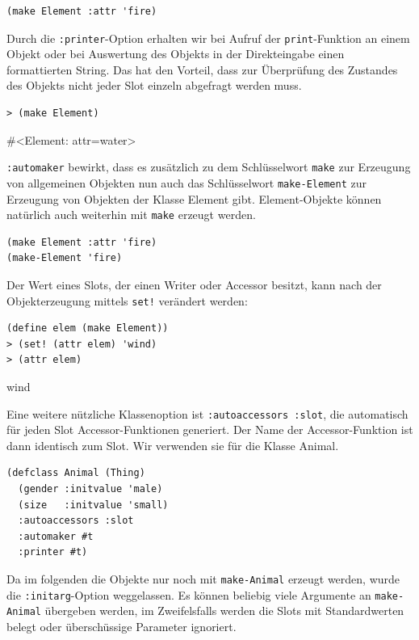 \begin{lstlisting}
(make Element :attr 'fire)
\end{lstlisting}

Durch die \texttt{:printer}-Option erhalten wir bei Aufruf der \texttt{print}-Funktion an einem Objekt oder bei Auswertung des Objekts in der Direkteingabe einen formattierten String. Das hat den Vorteil, dass zur Überprüfung des Zustandes des Objekts nicht jeder Slot einzeln abgefragt werden muss.

\begin{lstlisting}
> (make Element)
\end{lstlisting}
{\routput \#<Element: attr=water>}

\texttt{:automaker} bewirkt, dass es zusätzlich zu dem Schlüsselwort \texttt{make} zur Erzeugung von allgemeinen Objekten nun auch das Schlüsselwort \texttt{make-Element} zur Erzeugung von Objekten der Klasse Element gibt. Element-Objekte können natürlich auch weiterhin mit \texttt{make} erzeugt werden.

\begin{lstlisting}
(make Element :attr 'fire)
(make-Element 'fire)
\end{lstlisting}

Der Wert eines Slots, der einen Writer oder Accessor besitzt, kann nach der Objekterzeugung mittels \texttt{set!} verändert werden:

\begin{lstlisting}
(define elem (make Element))
> (set! (attr elem) 'wind)
> (attr elem)
\end{lstlisting}
{\routput wind}

Eine weitere nützliche Klassenoption ist \texttt{:autoaccessors :slot}, die automatisch für jeden Slot Accessor-Funktionen generiert. Der Name der Accessor-Funktion ist dann identisch zum Slot. Wir verwenden sie für die Klasse Animal.

\begin{lstlisting}
(defclass Animal (Thing)
  (gender :initvalue 'male)
  (size   :initvalue 'small)
  :autoaccessors :slot
  :automaker #t
  :printer #t)
\end{lstlisting}

Da im folgenden die Objekte nur noch mit \texttt{make-Animal} erzeugt werden, wurde die \texttt{:initarg}-Option weggelassen. Es können beliebig viele Argumente an \texttt{make-Animal} übergeben werden, im Zweifelsfalls werden die Slots mit Standardwerten belegt oder überschüssige Parameter ignoriert.

